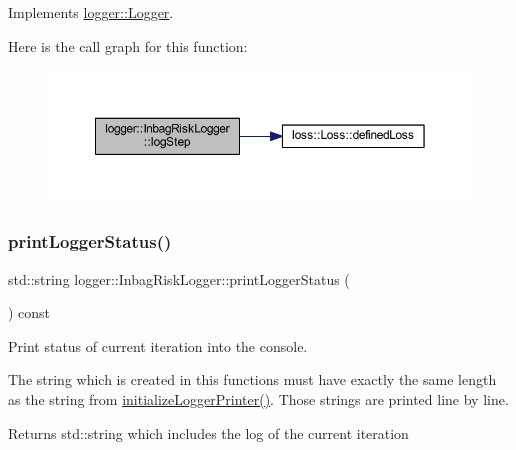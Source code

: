 Implements \mbox{\hyperlink{classlogger_1_1_logger_a91d987a86698e455b6fd3468f266d3fe}{logger\+::\+Logger}}.

Here is the call graph for this function\+:\nopagebreak
\begin{figure}[H]
\begin{center}
\leavevmode
\includegraphics[width=350pt]{classlogger_1_1_inbag_risk_logger_ad90612e1b684287a29bdbde1077d65d7_cgraph}
\end{center}
\end{figure}
\mbox{\label{classlogger_1_1_inbag_risk_logger_a040213adf29a645f0fd5356b951627d0}} 
\subsubsection{\texorpdfstring{print\+Logger\+Status()}{printLoggerStatus()}}
{\footnotesize\ttfamily std\+::string logger\+::\+Inbag\+Risk\+Logger\+::print\+Logger\+Status (\begin{DoxyParamCaption}{ }\end{DoxyParamCaption}) const\hspace{0.3cm}{\ttfamily [virtual]}}



Print status of current iteration into the console. 

The string which is created in this functions must have exactly the same length as the string from {\ttfamily \mbox{\hyperlink{classlogger_1_1_inbag_risk_logger_ab793454f28dae8d0901852b41a910ec7}{initialize\+Logger\+Printer()}}}. Those strings are printed line by line.

\begin{DoxyReturn}{Returns}
{\ttfamily std\+::string} which includes the log of the current iteration 
\end{DoxyReturn}


